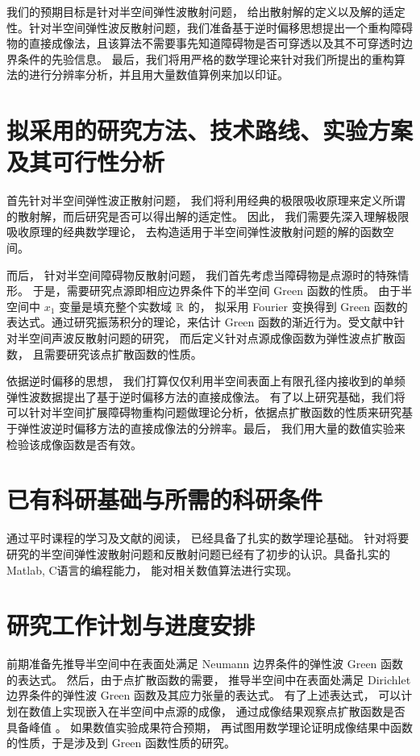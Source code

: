 我们的预期目标是针对半空间弹性波散射问题， 给出散射解的定义以及解的适定性。针对半空间弹性波反散射问题，我们准备基于逆时偏移思想提出一个重构障碍物的直接成像法，且该算法不需要事先知道障碍物是否可穿透以及其不可穿透时边界条件的先验信息。 最后，我们将用严格的数学理论来针对我们所提出的重构算法的进行分辨率分析，并且用大量数值算例来加以印证。

\section{拟采用的研究方法、技术路线、实验方案及其可行性分析}

首先针对半空间弹性波正散射问题， 我们将利用经典的极限吸收原理来定义所谓的散射解，而后研究是否可以得出解的适定性。 因此， 我们需要先深入理解极限吸收原理的经典数学理论， 去构造适用于半空间弹性波散射问题的解的函数空间。

而后， 针对半空间障碍物反散射问题， 我们首先考虑当障碍物是点源时的特殊情形。 于是，需要研究点源即相应边界条件下的半空间 Green 函数的性质。 由于半空间中 $x_1$ 变量是填充整个实数域 $\mathbb{R}$ 的， 拟采用 Fourier 变换得到 Green 函数的表达式。通过研究振荡积分的理论，来估计 Green 函数的渐近行为。受文献\cite{RTMhalf_aco}中针对半空间声波反散射问题的研究， 而后定义针对点源成像函数为弹性波点扩散函数， 且需要研究该点扩散函数的性质。

依据逆时偏移的思想， 我们打算仅仅利用半空间表面上有限孔径内接收到的单频弹性波数据提出了基于逆时偏移方法的直接成像法。 有了以上研究基础，我们将可以针对半空间扩展障碍物重构问题做理论分析，依据点扩散函数的性质来研究基于弹性波逆时偏移方法的直接成像法的分辨率。最后， 我们用大量的数值实验来检验该成像函数是否有效。
\section{已有科研基础与所需的科研条件}
通过平时课程的学习及文献的阅读， 已经具备了扎实的数学理论基础。 针对将要研究的半空间弹性波散射问题和反散射问题已经有了初步的认识。具备扎实的 Matlab, C语言的编程能力， 能对相关数值算法进行实现。


\section{研究工作计划与进度安排}

前期准备先推导半空间中在表面处满足 Neumann 边界条件的弹性波 Green 函数的表达式。 然后，由于点扩散函数的需要， 推导半空间中在表面处满足 Dirichlet 边界条件的弹性波 Green 函数及其应力张量的表达式。 有了上述表达式， 可以计划在数值上实现嵌入在半空间中点源的成像， 通过成像结果观察点扩散函数是否具备峰值 。 如果数值实验成果符合预期， 再试图用数学理论证明成像结果中函数的性质，于是涉及到 Green 函数性质的研究。

